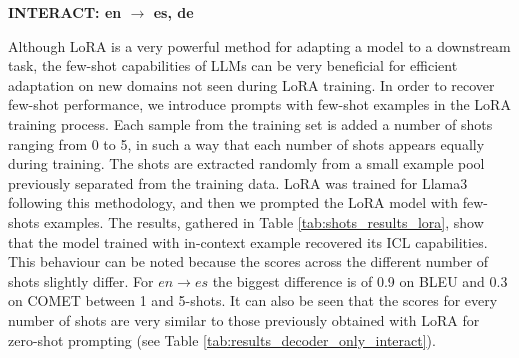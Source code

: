 \documentclass[11pt,english,listoffigures,listoftables]{tfgetsinf}
\begin{document}
\begin{table}[h]
    \centering
    \caption{BLEU and COMET scores for Llama3 zero-shot fine-tuned model prompted with few-shots on INTERACT test set.}
    \label{tab:shots_results_finetuned}
    \textbf{INTERACT: en $\rightarrow$ es, de \\}
\end{table}


Although LoRA is a very powerful method for adapting a model to a downstream task, the few-shot capabilities of LLMs can be very beneficial for efficient adaptation on new domains not seen during LoRA training. In order to recover few-shot performance, we introduce prompts with few-shot examples in the LoRA training process. Each sample from the training set is added a number of shots ranging from 0 to 5, in such a way that each number of shots appears equally during training. The shots are extracted randomly from a small example pool previously separated from the training data. LoRA was trained for Llama3 following this methodology, and then we prompted the LoRA model with few-shots examples. The results, gathered in Table \ref{tab:shots_results_lora}, show that the model trained with in-context example recovered its ICL capabilities. This behaviour can be noted because the scores across the different number of shots slightly differ. For $en \rightarrow es$ the biggest difference is of 0.9 on BLEU and 0.3 on COMET between 1 and 5-shots. It can also be seen that the scores for every number of shots are very similar to those previously obtained with LoRA for zero-shot prompting (see Table \ref{tab:results_decoder_only_interact}). 
\end{document}
